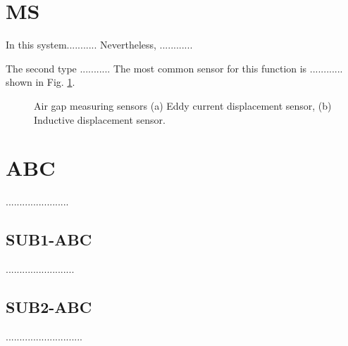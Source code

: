 \section{MS} 
\label{Measurement Sensors}
\noindent In this system...........
Nevertheless, ............

The second type ........... The most common sensor for this function is ............ shown in Fig. \ref{fig:gapsensor}.
\begin{figure}[!h!t]
	\centering
	\caption{Air gap measuring sensors (a) Eddy current displacement sensor, (b) Inductive displacement sensor.}
	\label{fig:gapsensor}
\end{figure}


\section{ABC} 
.......................
\subsection{SUB1-ABC}
.........................

\subsection{SUB2-ABC}
............................


